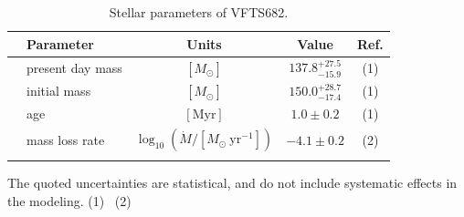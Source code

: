 \documentclass[a4paper,fleqn,usenatbib]{mnras}
\begin{document}
\begin{table}
  \begin{center}
    \caption{Stellar parameters of VFTS682.}
    \vspace*{-15pt}
    \begin{tabular}{llc|c|c}
      \hline\hline
      &Parameter & Units & Value & Ref.\\[2pt]     
       \hline
     & present day mass  & $[M_\odot]$ & $137.8^{+27.5}_
                                           {-15.9}$ & (1)
                                                    \\[2pt]
      & initial mass& $[M_\odot]$ & $150.0^{+28.7}_{-17.4}$ & (1)
      \\[2pt]
      &age & $[\mathrm{Myr}]$ & $1.0\pm0.2$ & (1) \\[2pt]
      & mass loss rate & $\log_{10}(\dot{M}/[M_\odot \ \mathrm{yr}^{-1}])$ & $-4.1\pm0.2$ & (2)\\[2pt]
      \hline
      \label{tab:star_param}
    \end{tabular}
    \vspace*{-5pt}
    {\tiny The quoted uncertainties are statistical, and do not include systematic
      effects in the modeling.
      (1)~\cite{schneider:18}
      (2)~\cite{bestenlehner:11}}
  \end{center}
\end{table}
\end{document}
